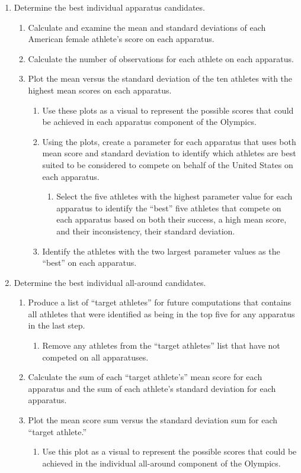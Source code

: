 \documentclass[12pt]{article}
\begin{document}
\begin{enumerate}
  \item Determine the best individual apparatus candidates.
  \begin{enumerate}
    \item Calculate and examine the mean and standard deviations of each American female athlete's score 
    on each apparatus.
    \item Calculate the number of observations for each athlete on each apparatus.
    \item Plot the mean versus the standard deviation of the ten athletes with the highest mean scores on each 
    apparatus.
    \begin{enumerate}
      \item Use these plots as a visual to represent the possible scores that could be achieved in each apparatus 
     component of the Olympics.
     \item Using the plots, create a parameter for each apparatus that uses both mean score and standard 
     deviation to identify which athletes are best suited to be considered to compete on behalf of the United 
     States on each apparatus.
     \begin{enumerate}
       \item Select the five athletes with the highest parameter value for each apparatus to identify the ``best'' 
        five athletes that compete on each apparatus based on both their success, a high mean score, and their 
        inconsistency, their standard deviation.
     \end{enumerate}
     \item Identify the athletes with the two largest parameter values as the ``best'' on each apparatus.
    \end{enumerate}
  \end{enumerate}
  \item Determine the best individual all-around candidates.
  \begin{enumerate}
   \item Produce a list of ``target athletes'' for future computations that contains all athletes that were identified 
   as being in the top five for any apparatus in the last step.
   \begin{enumerate}
     \item Remove any athletes from the ``target athletes'' list that have not competed on all apparatuses.
   \end{enumerate}
   \item Calculate the sum of each ``target athlete's'' mean score for each apparatus and the sum of each athlete's standard 
   deviation for each apparatus.
    \item Plot the mean score sum versus the standard deviation sum for each ``target athlete.''
   \begin{enumerate}
     \item Use this plot as a visual to represent the possible scores that could be achieved in the individual all-around 
     component of the Olympics.
   \end{enumerate}
  \end{enumerate}


\end{enumerate}
\end{document}
